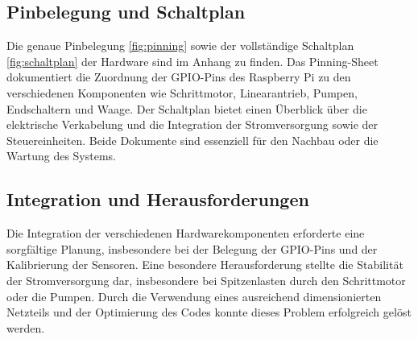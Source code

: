 \subsection{Pinbelegung und Schaltplan}
Die genaue Pinbelegung \ref{fig:pinning} sowie der vollständige Schaltplan \ref{fig:schaltplan} der Hardware sind im Anhang zu finden. Das Pinning-Sheet dokumentiert die Zuordnung der GPIO-Pins des Raspberry Pi zu den verschiedenen Komponenten wie Schrittmotor, Linearantrieb, Pumpen, Endschaltern und Waage. Der Schaltplan bietet einen Überblick über die elektrische Verkabelung und die Integration der Stromversorgung sowie der Steuereinheiten. Beide Dokumente sind essenziell für den Nachbau oder die Wartung des Systems.

\subsection{Integration und Herausforderungen}
Die Integration der verschiedenen Hardwarekomponenten erforderte eine sorgfältige Planung, insbesondere bei der Belegung der GPIO-Pins und der Kalibrierung der Sensoren. Eine besondere Herausforderung stellte die Stabilität der Stromversorgung dar, insbesondere bei Spitzenlasten durch den Schrittmotor oder die Pumpen. Durch die Verwendung eines ausreichend dimensionierten Netzteils und der Optimierung des Codes konnte dieses Problem erfolgreich gelöst werden.
